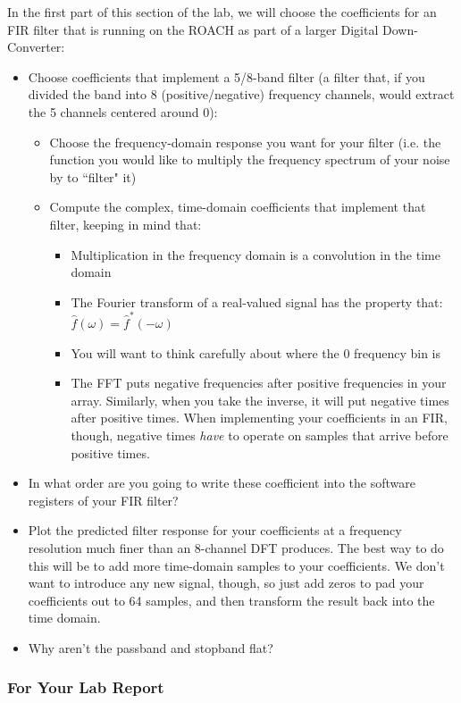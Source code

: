\documentclass[11pt]{article}
\begin{document}
In the first part of this section of the lab, we will choose the coefficients for an FIR filter that is running
on the ROACH as part of a larger Digital Down-Converter:
\begin{itemize}[noitemsep,nolistsep]
\item Choose coefficients that implement a 5/8-band filter (a filter that, if you divided the band into 8 
(positive/negative) frequency channels, would extract the 5 channels centered around 0):
\begin{itemize}[noitemsep,nolistsep]
\item Choose the frequency-domain response you want for your filter (i.e. the function you would like to multiply
the frequency spectrum of your noise by to ``filter" it)
\item Compute the complex, time-domain coefficients that implement that filter, keeping in mind that: 
\begin{itemize}[noitemsep,nolistsep]
\item Multiplication in the frequency domain is a convolution in the time domain
\item The Fourier transform of a real-valued signal has the property that:
$\hat f(\omega) = \hat f^*(-\omega)$
\item You will want to think carefully about where the 0 frequency bin is
\item The FFT puts negative frequencies after positive frequencies in your array.  Similarly, when you take the inverse, it will put negative times after positive times.  When implementing your coefficients in an FIR, though, negative times {\it have} to operate on samples that arrive before positive times.
\end{itemize}
\end{itemize}
\item In what order are you going to write these coefficient into the software registers of your FIR filter?
\item Plot the predicted filter response for your coefficients at a frequency resolution much finer than an 8-channel
DFT produces.  The best way to do this will be to add more time-domain samples to your coefficients.  We don't want to introduce any new signal, though, so just add zeros to pad your coefficients out to 64 samples, and then transform the result back into the time domain.  
\item Why aren't the passband and stopband flat?
\end{itemize}

\subsubsection{For Your Lab Report}
\end{document}
